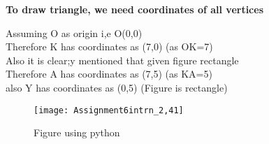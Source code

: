 \documentclass[a4paper,12pt]{article}
\begin{document}
\textbf{To draw triangle, we need coordinates of all vertices}

Assuming O as origin i,e O(0,0)\\

Therefore K has coordinates as (7,0)   \hspace*{2cm}(as OK=7)\\

Also it is clear;y mentioned that given figure rectangle\\

Therefore A has coordinates as (7,5)   \hspace*{1cm} (as KA=5)\\

also Y has coordinates as (0,5)  \hspace*{1cm} (Figure is rectangle)\\

\begin{figure}[h]
\centering
\texttt{[image: Assignment6intrn\_2,41]}
\caption{Figure using python}
\end{figure}
\end{document}
